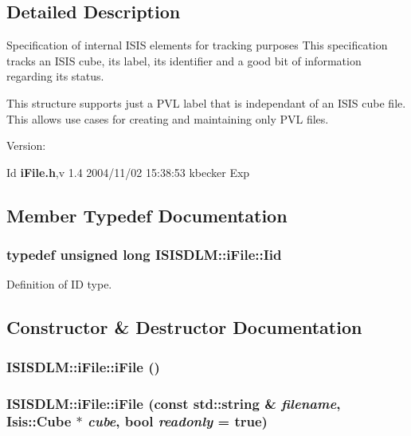 \subsection{Detailed Description}
Specification of internal ISIS elements for tracking purposes This specification tracks an ISIS cube, its label, its identifier and a good bit of information regarding its status.

This structure supports just a PVL label that is independant of an ISIS cube file. This allows use cases for creating and maintaining only PVL files.

Version: \begin{Desc}
\item[Id]{\bf i\-File.h},v 1.4 2004/11/02 15:38:53 kbecker Exp \end{Desc}




\subsection{Member Typedef Documentation}
\subsubsection{\setlength{\rightskip}{0pt plus 5cm}typedef unsigned long {\bf ISISDLM::i\-File::Iid}}\label{classISISDLM_1_1iFile_w0}


Definition of ID type. 



\subsection{Constructor \& Destructor Documentation}
\subsubsection{\setlength{\rightskip}{0pt plus 5cm}ISISDLM::i\-File::i\-File ()\hspace{0.3cm}{\tt  [protected]}}\label{classISISDLM_1_1iFile_b0}


\subsubsection{\setlength{\rightskip}{0pt plus 5cm}ISISDLM::i\-File::i\-File (const std::string \& {\em filename}, Isis::Cube $\ast$ {\em cube}, bool {\em readonly} = true)\hspace{0.3cm}{\tt  [protected]}}\label{classISISDLM_1_1iFile_b1}


